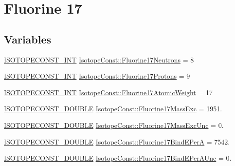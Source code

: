 \hypertarget{group___isotope_const-_fluorine-_f17}{}\section{Fluorine 17}
\label{group___isotope_const-_fluorine-_f17}
\subsection*{Variables}
\begin{DoxyCompactItemize}
\item 
\mbox{\hyperlink{group___isotope_const-_macros_ga5f18360b3e99483a35c32d789e62621c}{I\+S\+O\+T\+O\+P\+E\+C\+O\+N\+S\+T\+\_\+\+I\+NT}} \mbox{\hyperlink{group___isotope_const-_fluorine-_f17_ga1022e3599f1eab16a3559970a6fa4c7f}{Isotope\+Const\+::\+Fluorine17\+Neutrons}} = 8
\item 
\mbox{\hyperlink{group___isotope_const-_macros_ga5f18360b3e99483a35c32d789e62621c}{I\+S\+O\+T\+O\+P\+E\+C\+O\+N\+S\+T\+\_\+\+I\+NT}} \mbox{\hyperlink{group___isotope_const-_fluorine-_f17_ga8910b453f67679d7037182df2d1e8fe3}{Isotope\+Const\+::\+Fluorine17\+Protons}} = 9
\item 
\mbox{\hyperlink{group___isotope_const-_macros_ga5f18360b3e99483a35c32d789e62621c}{I\+S\+O\+T\+O\+P\+E\+C\+O\+N\+S\+T\+\_\+\+I\+NT}} \mbox{\hyperlink{group___isotope_const-_fluorine-_f17_ga5786271498d26fdea646fcb3778ea192}{Isotope\+Const\+::\+Fluorine17\+Atomic\+Weight}} = 17
\item 
\mbox{\hyperlink{group___isotope_const-_macros_ga8f45a7272ce02c0b4c65c44636ed719a}{I\+S\+O\+T\+O\+P\+E\+C\+O\+N\+S\+T\+\_\+\+D\+O\+U\+B\+LE}} \mbox{\hyperlink{group___isotope_const-_fluorine-_f17_ga32820265020843122dfb8abc9ac35c36}{Isotope\+Const\+::\+Fluorine17\+Mass\+Exc}} = 1951.
\item 
\mbox{\hyperlink{group___isotope_const-_macros_ga8f45a7272ce02c0b4c65c44636ed719a}{I\+S\+O\+T\+O\+P\+E\+C\+O\+N\+S\+T\+\_\+\+D\+O\+U\+B\+LE}} \mbox{\hyperlink{group___isotope_const-_fluorine-_f17_gabbba404031739de48b4de1f1b3b0aca2}{Isotope\+Const\+::\+Fluorine17\+Mass\+Exc\+Unc}} = 0.
\item 
\mbox{\hyperlink{group___isotope_const-_macros_ga8f45a7272ce02c0b4c65c44636ed719a}{I\+S\+O\+T\+O\+P\+E\+C\+O\+N\+S\+T\+\_\+\+D\+O\+U\+B\+LE}} \mbox{\hyperlink{group___isotope_const-_fluorine-_f17_ga4173b3ed10ce866e122506f937a179a4}{Isotope\+Const\+::\+Fluorine17\+Bind\+E\+PerA}} = 7542.
\item 
\mbox{\hyperlink{group___isotope_const-_macros_ga8f45a7272ce02c0b4c65c44636ed719a}{I\+S\+O\+T\+O\+P\+E\+C\+O\+N\+S\+T\+\_\+\+D\+O\+U\+B\+LE}} \mbox{\hyperlink{group___isotope_const-_fluorine-_f17_gac7ff4ebce5519da3068a43c23d0bc069}{Isotope\+Const\+::\+Fluorine17\+Bind\+E\+Per\+A\+Unc}} = 0.

\end{DoxyCompactItemize}
